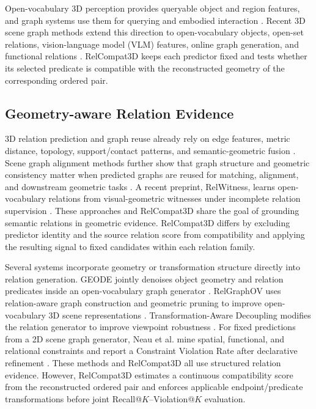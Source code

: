 Open-vocabulary 3D perception provides queryable object and region features, and graph systems use them for querying and embodied interaction \cite{peng2023openscene,takmaz2023openmask3d,gu2024conceptgraphs,werby2024hierarchical,maggio2024clio}.
Recent 3D scene graph methods extend this direction to open-vocabulary objects, open-set relations, vision-language model (VLM) features, online graph generation, and functional relations \cite{koch2024open3dsg,chen2024clip,hou2025fross,zhang2025open,wang2025open}. RelCompat3D keeps each predictor fixed and tests whether its selected predicate is compatible with the reconstructed geometry of the corresponding ordered pair. 

\subsection{Geometry-aware Relation Evidence}
3D relation prediction and graph reuse already rely on edge features, metric distance, topology, support/contact patterns, and semantic-geometric fusion \cite{zhang2021exploiting,feng20233d,xie2024sg,huang2025fireplace,shao2025great,sarkar2023sgaligner}. Scene graph alignment methods further show that graph structure and geometric consistency matter when predicted graphs are reused for matching, alignment, and downstream geometric tasks \cite{sarkar2023sgaligner, xie2024sg}. A recent preprint, RelWitness, learns open-vocabulary relations from visual-geometric witnesses under incomplete relation supervision \cite{nguyen2026relwitness}. These approaches and RelCompat3D share the goal of grounding semantic relations in geometric evidence. RelCompat3D differs by excluding predictor identity and the source relation score from compatibility and applying the resulting signal to fixed candidates within each relation family. 

Several systems incorporate geometry or transformation structure directly into relation generation. GEODE jointly denoises object geometry and relation predicates inside an open-vocabulary graph generator \cite{feng2026geode}. RelGraphOV uses relation-aware graph construction and geometric pruning to improve open-vocabulary 3D scene representations \cite{chen2026beyond}. Transformation-Aware Decoupling modifies the relation generator to improve viewpoint robustness \cite{sun2026not}. For fixed predictions from a 2D scene graph generator, Neau et al. mine spatial, functional, and relational constraints and report a Constraint Violation Rate after declarative refinement \cite{neau2026visual}. These methods and RelCompat3D all use structured relation evidence. However, RelCompat3D estimates a continuous compatibility score from the reconstructed ordered pair and enforces applicable endpoint/predicate transformations before joint Recall@$K$--Violation@$K$ evaluation. 

